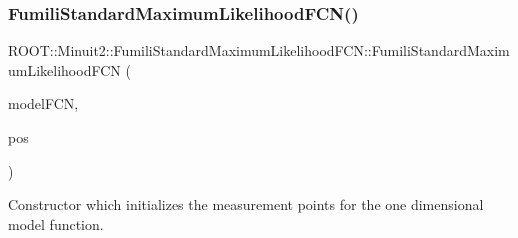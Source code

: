 \mbox{\label{classROOT_1_1Minuit2_1_1FumiliStandardMaximumLikelihoodFCN_af7dc80571b509a0a4f2f7ef821c3b1e6}} 
\subsubsection{\texorpdfstring{FumiliStandardMaximumLikelihoodFCN()}{FumiliStandardMaximumLikelihoodFCN()}\hspace{0.1cm}{\footnotesize\ttfamily [3/6]}}
{\footnotesize\ttfamily R\+O\+O\+T\+::\+Minuit2\+::\+Fumili\+Standard\+Maximum\+Likelihood\+F\+C\+N\+::\+Fumili\+Standard\+Maximum\+Likelihood\+F\+CN (\begin{DoxyParamCaption}\item[{const \mbox{\hyperlink{classROOT_1_1Minuit2_1_1ParametricFunction}{Parametric\+Function}} \&}]{model\+F\+CN,  }\item[{const std\+::vector$<$ double $>$ \&}]{pos }\end{DoxyParamCaption})\hspace{0.3cm}{\ttfamily [inline]}}

Constructor which initializes the measurement points for the one dimensional model function.


